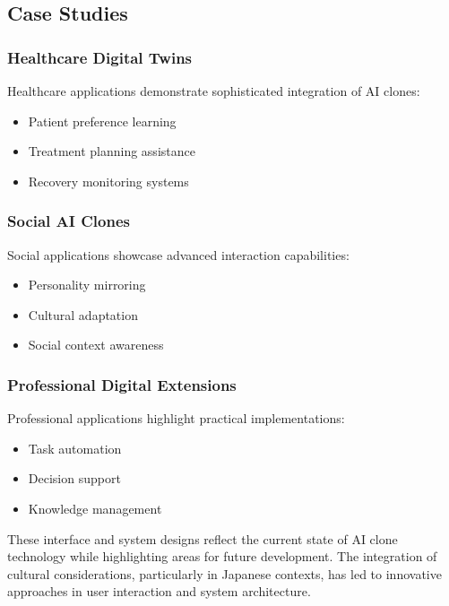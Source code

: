 \subsection{Case Studies}

\subsubsection{Healthcare Digital Twins}
Healthcare applications demonstrate sophisticated integration of AI clones:
\begin{itemize}
\item Patient preference learning
\item Treatment planning assistance
\item Recovery monitoring systems
\end{itemize}

\subsubsection{Social AI Clones}
Social applications showcase advanced interaction capabilities:
\begin{itemize}
\item Personality mirroring
\item Cultural adaptation
\item Social context awareness
\end{itemize}

\subsubsection{Professional Digital Extensions}
Professional applications highlight practical implementations:
\begin{itemize}
\item Task automation
\item Decision support
\item Knowledge management
\end{itemize}

These interface and system designs reflect the current state of AI clone technology while highlighting areas for future development. The integration of cultural considerations, particularly in Japanese contexts, has led to innovative approaches in user interaction and system architecture.
